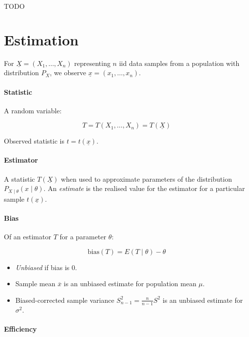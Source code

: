 \documentclass[twocolumn,english]{article}
\begin{document}
TODO

\section{Estimation}

For $\underline{X}=\left(X_{1},\dots,X_{n}\right)$ representing $n$
iid data samples from a population with distribution $P_{X}$, we
observe $\underline{x}=\left(x_{1},\dots,x_{n}\right)$.

\paragraph{Statistic}

A random variable:

\[
T=T\left(X_{1},\dots,X_{n}\right)=T\left(\underline{X}\right)
\]

Observed statistic is $t=t\left(\underline{x}\right)$.

\paragraph{Estimator}

A statistic $T\left(\underline{X}\right)$ when used to approximate
parameters of the distribution $P_{X\mid\theta}\left(x\mid\theta\right)$.
An \emph{estimate} is the realised value for the estimator for a particular
sample $t\left(\underline{x}\right)$.

\paragraph{Bias}

Of an estimator $T$ for a parameter $\theta$:

\[
\text{bias}\left(T\right)=E\left(T\mid\theta\right)-\theta
\]
\begin{itemize}
\item \emph{Unbiased} if bias is 0.
\item Sample mean $\overline{x}$ is an unbiased estimate for population
mean $\mu$.
\item Biased-corrected sample variance $S_{n-1}^{2}=\frac{n}{n-1}S^{2}$
is an unbiased estimate for $\sigma^{2}$.
\end{itemize}

\paragraph{Efficiency}
\end{document}
